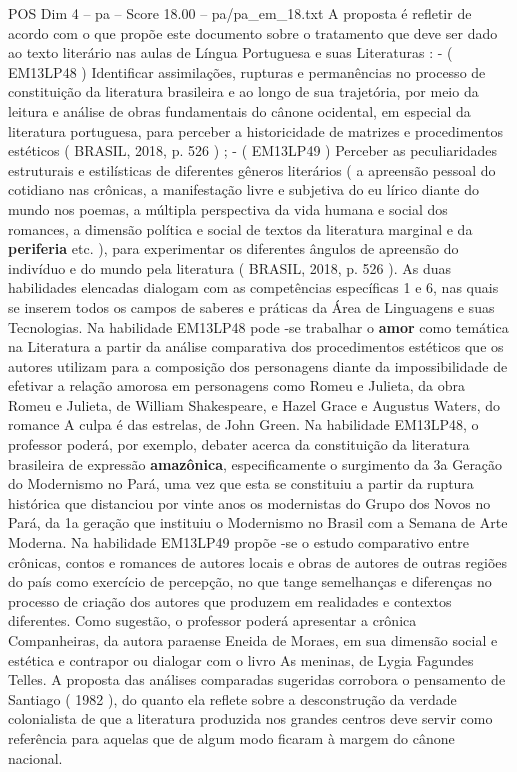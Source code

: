 \begin{textsample}{POS Dim 4 – pa – Score 18.00 – pa/pa\_em\_18.txt}
A proposta é refletir de acordo com o que propõe este documento sobre o tratamento que deve ser dado ao texto literário nas aulas de Língua Portuguesa e suas Literaturas : - ( EM13LP48 ) Identificar assimilações, rupturas e permanências no processo de constituição da literatura brasileira e ao longo de sua trajetória, por meio da leitura e análise de obras fundamentais do cânone ocidental, em especial da literatura portuguesa, para perceber a historicidade de matrizes e procedimentos estéticos ( BRASIL, 2018, p. 526 ) ; - ( EM13LP49 ) Perceber as peculiaridades estruturais e estilísticas de diferentes gêneros literários ( a apreensão pessoal do cotidiano nas crônicas, a manifestação livre e subjetiva do eu lírico diante do mundo nos poemas, a múltipla perspectiva da vida humana e social dos romances, a dimensão política e social de textos da literatura marginal e da \textbf{periferia} etc. ), para experimentar os diferentes ângulos de apreensão do indivíduo e do mundo pela literatura ( BRASIL, 2018, p. 526 ).
As duas habilidades elencadas dialogam com as competências específicas 1 e 6, nas quais se inserem todos os campos de saberes e práticas da Área de Linguagens e suas Tecnologias.
Na habilidade EM13LP48 pode -se trabalhar o \textbf{amor} como temática na Literatura a partir da análise comparativa dos procedimentos estéticos que os autores utilizam para a composição dos personagens diante da impossibilidade de efetivar a relação amorosa em personagens como Romeu e Julieta, da obra Romeu e Julieta, de William Shakespeare, e Hazel Grace e Augustus Waters, do romance A culpa é das estrelas, de John Green.
Na habilidade EM13LP48, o professor poderá, por exemplo, debater acerca da constituição da literatura brasileira de expressão \textbf{amazônica}, especificamente o surgimento da 3a Geração do Modernismo no Pará, uma vez que esta se constituiu a partir da ruptura histórica que distanciou por vinte anos os modernistas do Grupo dos Novos no Pará, da 1a geração que instituiu o Modernismo no Brasil com a Semana de Arte Moderna.
Na habilidade EM13LP49 propõe -se o estudo comparativo entre crônicas, contos e romances de autores locais e obras de autores de outras regiões do país como exercício de percepção, no que tange semelhanças e diferenças no processo de criação dos autores que produzem em realidades e contextos diferentes.
Como sugestão, o professor poderá apresentar a crônica Companheiras, da autora paraense Eneida de Moraes, em sua dimensão social e estética e contrapor ou dialogar com o livro As meninas, de Lygia Fagundes Telles.
A proposta das análises comparadas sugeridas corrobora o pensamento de Santiago ( 1982 ), do quanto ela reflete sobre a desconstrução da verdade colonialista de que a literatura produzida nos grandes centros deve servir como referência para aquelas que de algum modo ficaram à margem do cânone nacional.

\end{textsample}

